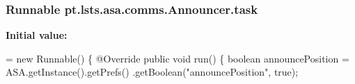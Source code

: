 \subsubsection[{task}]{\setlength{\rightskip}{0pt plus 5cm}Runnable pt.\+lsts.\+asa.\+comms.\+Announcer.\+task\hspace{0.3cm}{\ttfamily [private]}}\label{classpt_1_1lsts_1_1asa_1_1comms_1_1Announcer_a95133bcfa573e3178268dc3b05cbe131}
{\bfseries Initial value\+:}
\begin{DoxyCode}
= \textcolor{keyword}{new} Runnable() \{
        @Override
        \textcolor{keyword}{public} \textcolor{keywordtype}{void} run() \{
            \textcolor{keywordtype}{boolean} announcePosition = ASA.getInstance().getPrefs()
                    .getBoolean(\textcolor{stringliteral}{"announcePosition"}, \textcolor{keyword}{true});


\end{DoxyCode}
